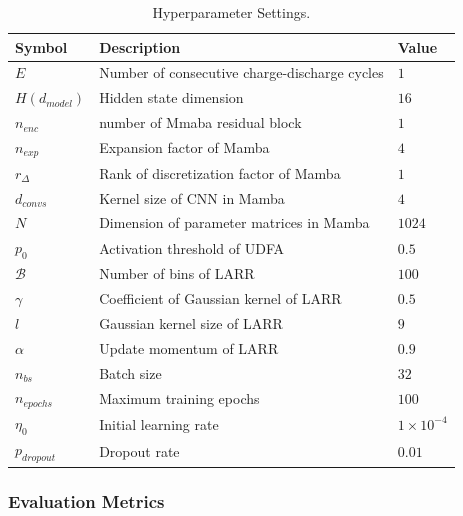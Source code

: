 \documentclass[lettersize,journal]{IEEEtran}
\begin{document}
\begin{table}[htbp]
\centering
\caption{Hyperparameter Settings.}
\scalebox{0.8}
{
    \small
\begin{threeparttable}
    \begin{tabular}{rll}
    \toprule
    \multicolumn{1}{l}{Symbol} & Description & Value \\
    \midrule
    \multicolumn{1}{l}{$E$} & Number of consecutive charge-discharge cycles & $1$ \\
    \multicolumn{1}{l}{$H (d_{model})$} & Hidden state dimension & $16$ \\
    \multicolumn{1}{l}{$n_{enc}$} & number of Mmaba residual block & $1$ \\
    \multicolumn{1}{l}{$n_{exp}$} & Expansion factor of Mamba & $4$ \\
    \multicolumn{1}{l}{$r_{\Delta}$} & Rank of discretization factor of Mamba & $1$ \\
    \multicolumn{1}{l}{$d_{convs}$} & Kernel size of CNN in Mamba & $4$ \\
    \multicolumn{1}{l}{$N$} & Dimension of parameter matrices in Mamba & $1024$ \\
    \multicolumn{1}{l}{$p_{0}$} & Activation threshold of UDFA & $0.5$ \\
    \multicolumn{1}{l}{$\mathcal{B}$} & Number of bins of LARR & $100$ \\
    \multicolumn{1}{l}{$\gamma$} & Coefficient of Gaussian kernel of LARR & $0.5$ \\
    \multicolumn{1}{l}{$l$} & Gaussian kernel size of LARR & $9$ \\
    \multicolumn{1}{l}{$\alpha$} & Update momentum of LARR & $0.9$ \\
    \multicolumn{1}{l}{$n_{bs}$} & Batch size & $32$ \\
    \multicolumn{1}{l}{$n_{epochs}$} & Maximum training epochs & $100$ \\
    \multicolumn{1}{l}{$\eta_{0}$} & Initial learning rate & $1 \times 10^{-4}$ \\
    \multicolumn{1}{l}{$p_{dropout}$} & Dropout rate & $0.01$ \\
    \bottomrule
    \end{tabular}%
\end{threeparttable}
}
\label{tab:hyperparameters_setting}%
\end{table}%

\subsubsection{Evaluation Metrics}
\end{document}
